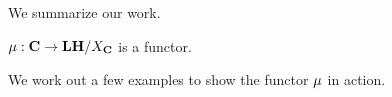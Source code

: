 
We summarize our work.
\begin{corollary}
\label{coro:we have a McCord functor}
$\operatorname{\mu} : \mathbf{C} \to \mathbf{LH}/X_{\mathbf{C}}$ is a functor.
\end{corollary}

We work out a few examples to show the functor $\operatorname{\mu}$ in action.

